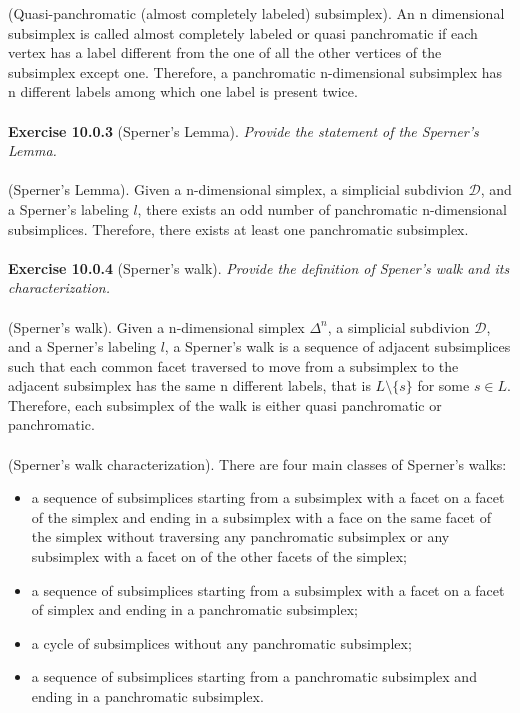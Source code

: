 (Quasi-panchromatic (almost completely labeled) subsimplex). An n dimensional subsimplex is called almost completely labeled or quasi panchromatic if each vertex has a label different from the one of all the other vertices of the subsimplex except one. Therefore, a panchromatic n-dimensional subsimplex has n different labels among which one label is present twice.\\\\
\textbf{Exercise 10.0.3} (Sperner’s Lemma). \textit{Provide the statement of the Sperner’s Lemma.}\\\\
(Sperner’s Lemma). Given a n-dimensional simplex, a simplicial subdivion $ \mathcal{D} $, and a Sperner’s labeling $l$, there exists an odd number of panchromatic n-dimensional subsimplices. Therefore, there exists at least one panchromatic subsimplex.\\\\
\textbf{Exercise 10.0.4} (Sperner’s walk). \textit{Provide the definition of Spener’s walk and its characterization.}\\\\
(Sperner’s walk). Given a n-dimensional simplex $\Delta^n$, a simplicial subdivion $ \mathcal{D} $, and a Sperner’s labeling $l$, a Sperner’s walk is a sequence of adjacent subsimplices such that each common facet traversed to move from a subsimplex to the adjacent subsimplex has the same n different labels, that is $L \setminus \{s\}$ for some $s \in L$.
Therefore, each subsimplex of the walk is either quasi panchromatic or panchromatic.\\\\
(Sperner’s walk characterization). There are four main classes of Sperner’s walks:
\begin{itemize}
\item a sequence of subsimplices starting from a subsimplex with a facet on a facet of the simplex and ending in a subsimplex with a face on the same facet of the simplex without traversing any panchromatic subsimplex or any subsimplex with a facet on of the other facets of the simplex;
\item a sequence of subsimplices starting from a subsimplex with a facet on a facet of simplex and ending in a panchromatic subsimplex;
\item a cycle of subsimplices without any panchromatic subsimplex;
\item a sequence of subsimplices starting from a panchromatic subsimplex and ending in a panchromatic subsimplex.
\end{itemize}
